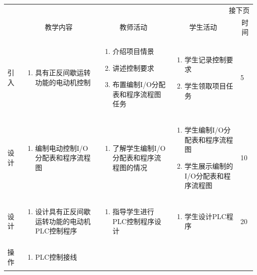 {\begin{landscape}
\begin{longtable}{|m{10mm}|m{50mm}|m{50mm}|m{50mm}|m{15mm}|}
\multicolumn{5}{r}{\small 接下页}\\
\endfoot
\hline
\endlastfoot
\multicolumn{1}{|c|}{步骤}&\multicolumn{1}{c|}{教学内容}&\multicolumn{1}{c|}{教师活动}&\multicolumn{1}{c|}{学生活动}&\multicolumn{1}{c|}{时间}\\\hline
引入&\begin{enumerate}
\item 具有正反间歇运转功能的电动机控制
\end{enumerate} &\begin{enumerate}
\item 介绍项目情景
\item 讲述控制要求
\item 布置编制I/O分配表和程序流程图任务
\end{enumerate} &\begin{enumerate}
\item 学生记录控制要求
\item 学生领取项目任务
\end{enumerate} &5 \\\hline
设计&
\begin{enumerate}
\item 编制电动控制I/O分配表和程序流程图
\end{enumerate} &\begin{enumerate}
\item 了解学生编制I/O分配表和程序流程图的情况
\end{enumerate} &\begin{enumerate}
\item 学生编制I/O分配表和程序流程图
\item 学生展示编制的I/O分配表和程序流程图
\end{enumerate} &10 \\\hline
设计&\begin{enumerate}
\item 设计具有正反间歇运转功能的电动机PLC控制程序
\end{enumerate}
&\begin{enumerate}
\item 指导学生进行PLC控制程序设计
\end{enumerate} &\begin{enumerate}
\item 学生设计PLC程序
\end{enumerate} &20 \\\hline
操作&
\begin{enumerate}
\item PLC控制接线
\end{enumerate} &\begin{enumerate}

\end{enumerate}
\end{longtable}
\end{landscape}}
